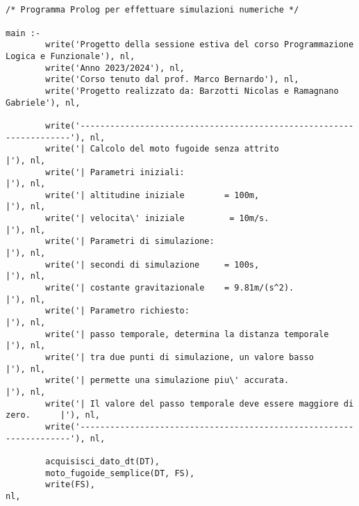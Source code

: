 
\scriptsize
\begin{verbatim}
   

/* Programma Prolog per effettuare simulazioni numeriche */

main :- 
        write('Progetto della sessione estiva del corso Programmazione Logica e Funzionale'), nl,
        write('Anno 2023/2024'), nl,
        write('Corso tenuto dal prof. Marco Bernardo'), nl,
        write('Progetto realizzato da: Barzotti Nicolas e Ramagnano Gabriele'), nl, 

        write('--------------------------------------------------------------------'), nl,
        write('| Calcolo del moto fugoide senza attrito                           |'), nl,
        write('| Parametri iniziali:                                              |'), nl,
        write('| altitudine iniziale        = 100m,                               |'), nl,
        write('| velocita\' iniziale         = 10m/s.                              |'), nl,
        write('| Parametri di simulazione:                                        |'), nl,
        write('| secondi di simulazione     = 100s,                               |'), nl,
        write('| costante gravitazionale    = 9.81m/(s^2).                        |'), nl,
        write('| Parametro richiesto:                                             |'), nl,
        write('| passo temporale, determina la distanza temporale                 |'), nl,
        write('| tra due punti di simulazione, un valore basso                    |'), nl,
        write('| permette una simulazione piu\' accurata.                          |'), nl,
        write('| Il valore del passo temporale deve essere maggiore di zero.      |'), nl,
        write('--------------------------------------------------------------------'), nl,

        acquisisci_dato_dt(DT),                                                        
        moto_fugoide_semplice(DT, FS),
        write(FS),                                                                     nl,


\end{verbatim}
